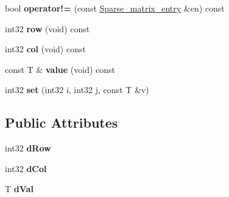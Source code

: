 \begin{DoxyCompactItemize}
\item 
\hypertarget{structnih_1_1_sparse__matrix__entry_a1541785e1a084666fd314ae4541a0b64}{
bool {\bfseries operator!=} (const \hyperlink{structnih_1_1_sparse__matrix__entry}{\-Sparse\-\_\-matrix\-\_\-entry} \&en) const }
\label{structnih_1_1_sparse__matrix__entry_a1541785e1a084666fd314ae4541a0b64}

\item 
\hypertarget{structnih_1_1_sparse__matrix__entry_a23d243f446af3e80b2f52f8d163c67ab}{
int32 {\bfseries row} (void) const }
\label{structnih_1_1_sparse__matrix__entry_a23d243f446af3e80b2f52f8d163c67ab}

\item 
\hypertarget{structnih_1_1_sparse__matrix__entry_afdd887c8b38a7c6f34f44d891bc404be}{
int32 {\bfseries col} (void) const }
\label{structnih_1_1_sparse__matrix__entry_afdd887c8b38a7c6f34f44d891bc404be}

\item 
\hypertarget{structnih_1_1_sparse__matrix__entry_acff68bb5e1dc294cf834fb5451b11fcd}{
const \-T \& {\bfseries value} (void) const }
\label{structnih_1_1_sparse__matrix__entry_acff68bb5e1dc294cf834fb5451b11fcd}

\item 
\hypertarget{structnih_1_1_sparse__matrix__entry_abdfdc8c1a50a5c772fe1935fefb8f352}{
int32 {\bfseries set} (int32 i, int32 j, const \-T \&v)}
\label{structnih_1_1_sparse__matrix__entry_abdfdc8c1a50a5c772fe1935fefb8f352}

\end{DoxyCompactItemize}
\subsection*{\-Public \-Attributes}
\begin{DoxyCompactItemize}
\item 
\hypertarget{structnih_1_1_sparse__matrix__entry_a4d481f251a7904fea13ff880c2d1f357}{
int32 {\bfseries d\-Row}}
\label{structnih_1_1_sparse__matrix__entry_a4d481f251a7904fea13ff880c2d1f357}

\item 
\hypertarget{structnih_1_1_sparse__matrix__entry_ac5ad3b16ba4ec80c9205004a8a23a71c}{
int32 {\bfseries d\-Col}}
\label{structnih_1_1_sparse__matrix__entry_ac5ad3b16ba4ec80c9205004a8a23a71c}

\item 
\hypertarget{structnih_1_1_sparse__matrix__entry_a3b8edf0b4fa59c6765f700c9e1de6614}{
\-T {\bfseries d\-Val}}
\label{structnih_1_1_sparse__matrix__entry_a3b8edf0b4fa59c6765f700c9e1de6614}

\end{DoxyCompactItemize}
